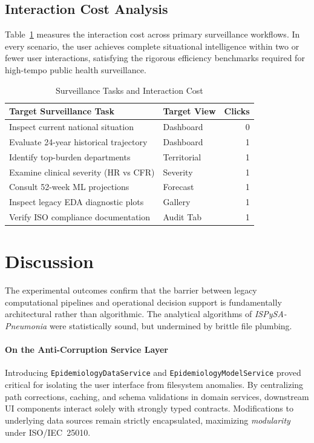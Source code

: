 \documentclass[conference]{IEEEtran}
\begin{document}
\subsection{Interaction Cost Analysis}

Table~\ref{tab:tasks} measures the interaction cost across primary surveillance workflows. In every scenario, the user achieves complete situational intelligence within two or fewer user interactions, satisfying the rigorous efficiency benchmarks required for high-tempo public health surveillance.

\begin{table}[!t]
\caption{Surveillance Tasks and Interaction Cost}
\label{tab:tasks}
\centering
\footnotesize
\begin{tabular}{@{}p{3.7cm}p{1.6cm}r@{}}
\toprule
\textbf{Target Surveillance Task} & \textbf{Target View} & \textbf{Clicks} \\
\midrule
Inspect current national situation & Dashboard & 0 \\
Evaluate 24-year historical trajectory & Dashboard & 1 \\
Identify top-burden departments & Territorial & 1 \\
Examine clinical severity (HR vs CFR) & Severity & 1 \\
Consult 52-week ML projections & Forecast & 1 \\
Inspect legacy EDA diagnostic plots & Gallery & 1 \\
Verify ISO compliance documentation & Audit Tab & 1 \\
\bottomrule
\end{tabular}
\end{table}

\section{Discussion}
\label{sec:discussion}

The experimental outcomes confirm that the barrier between legacy computational pipelines and operational decision support is fundamentally architectural rather than algorithmic. The analytical algorithms of \textit{ISPySA-Pneumonia} were statistically sound, but undermined by brittle file plumbing.

\paragraph{On the Anti-Corruption Service Layer}
Introducing \texttt{EpidemiologyDataService} and \texttt{EpidemiologyModelService} proved critical for isolating the user interface from filesystem anomalies. By centralizing path corrections, caching, and schema validations in domain services, downstream UI components interact solely with strongly typed contracts. Modifications to underlying data sources remain strictly encapsulated, maximizing \textit{modularity} under ISO/IEC~25010.
\end{document}
